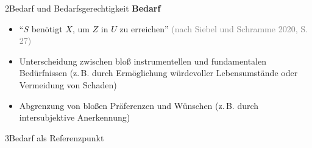 \documentclass[xcolor=table,9pt,aspectratio=169]{beamer}
\begin{document}
\begin{frame}{\vspace*{10mm}2\hspace*{1em}Bedarf und Bedarfsgerechtigkeit}
\textbf{Bedarf}\\
\medskip
\begin{itemize}
   \item \enquote{$S$ benötigt $X$, um $Z$ in $U$ zu erreichen} \textcolor{gray}{(nach Siebel und Schramme 2020, S. 27)}
   \item Unterscheidung zwischen bloß instrumentellen und fundamentalen Bedürfnissen (z.\,B. durch Ermöglichung würdevoller Lebensumstände oder Vermeidung von Schaden)
   \item Abgrenzung von bloßen Präferenzen und Wünschen (z.\,B. durch intersubjektive Anerkennung)
\end{itemize}
\end{frame}


\begin{frame}
\begin{overlayarea}{\textwidth}{0.81\paperheight}{
   \vspace*{11mm}
   \textcolor{uolblue}
   {3\hspace*{1em}Bedarf als Referenzpunkt}
}
\end{overlayarea}
\end{frame}
\end{document}
